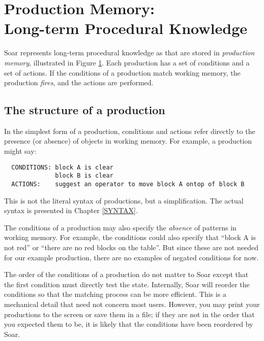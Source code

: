 \section{\texorpdfstring{Production Memory:\\ Long-term Procedural Knowledge}{Production Memory: Long-term Procedural Knowledge}} 
\label{ARCH-pm}

\begin{figure}
\label{fig:ab-prodmem}
\end{figure}

Soar represents long-term procedural knowledge as  that are stored in
\emph{production memory}, illustrated in Figure \ref{fig:ab-prodmem}. Each
production has a set of conditions and a set of actions.  If the
conditions of a production match working memory, the production
\emph{fires}, and the actions are performed.

\subsection{The structure of a production}
\label{ARCH-pm-structure}

In the simplest form of a production, conditions and actions refer directly to
the presence (or absence) of objects in working memory. For example, a
production might say:
\begin{verbatim}
  CONDITIONS: block A is clear 
              block B is clear 
  ACTIONS:    suggest an operator to move block A ontop of block B
\end{verbatim}
This is not the literal syntax of productions, but a simplification.
The actual syntax is presented in Chapter \ref{SYNTAX}.

The conditions of a production may also specify the \emph{absence} of patterns
in working memory. For example, the conditions could also specify that ``block
A is not red'' or ``there are no red blocks on the table''. But since these are
not needed for our example production, there are no examples of negated
conditions for now.

The order of the conditions of a production do not matter to Soar except
that the first condition must directly test the state. Internally, Soar
will reorder the conditions so that the matching process can be more
efficient. This is a mechanical detail that need not concern most
users. However, you may print your productions to the screen or save
them in a file; if they are not in the order that you expected them to
be, it is likely that the conditions have been reordered by Soar.

